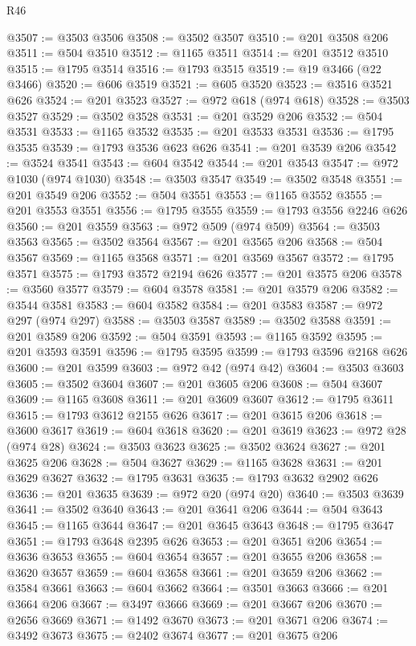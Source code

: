 \begin{lexlean}{R46}
\begin{coremodule}
@3507 := @3503 @3506
@3508 := @3502 @3507
@3510 := @201 @3508 @206
@3511 := @504 @3510
@3512 := @1165 @3511
@3514 := @201 @3512 @3510
@3515 := @1795 @3514
@3516 := @1793 @3515
@3519 := @19 @3466 (@22 @3466)
@3520 := @606 @3519
@3521 := @605 @3520
@3523 := @3516 @3521 @626
@3524 := @201 @3523
@3527 := @972 @618 (@974 @618)
@3528 := @3503 @3527
@3529 := @3502 @3528
@3531 := @201 @3529 @206
@3532 := @504 @3531
@3533 := @1165 @3532
@3535 := @201 @3533 @3531
@3536 := @1795 @3535
@3539 := @1793 @3536 @623 @626
@3541 := @201 @3539 @206
@3542 := @3524 @3541
@3543 := @604 @3542
@3544 := @201 @3543
@3547 := @972 @1030 (@974 @1030)
@3548 := @3503 @3547
@3549 := @3502 @3548
@3551 := @201 @3549 @206
@3552 := @504 @3551
@3553 := @1165 @3552
@3555 := @201 @3553 @3551
@3556 := @1795 @3555
@3559 := @1793 @3556 @2246 @626
@3560 := @201 @3559
@3563 := @972 @509 (@974 @509)
@3564 := @3503 @3563
@3565 := @3502 @3564
@3567 := @201 @3565 @206
@3568 := @504 @3567
@3569 := @1165 @3568
@3571 := @201 @3569 @3567
@3572 := @1795 @3571
@3575 := @1793 @3572 @2194 @626
@3577 := @201 @3575 @206
@3578 := @3560 @3577
@3579 := @604 @3578
@3581 := @201 @3579 @206
@3582 := @3544 @3581
@3583 := @604 @3582
@3584 := @201 @3583
@3587 := @972 @297 (@974 @297)
@3588 := @3503 @3587
@3589 := @3502 @3588
@3591 := @201 @3589 @206
@3592 := @504 @3591
@3593 := @1165 @3592
@3595 := @201 @3593 @3591
@3596 := @1795 @3595
@3599 := @1793 @3596 @2168 @626
@3600 := @201 @3599
@3603 := @972 @42 (@974 @42)
@3604 := @3503 @3603
@3605 := @3502 @3604
@3607 := @201 @3605 @206
@3608 := @504 @3607
@3609 := @1165 @3608
@3611 := @201 @3609 @3607
@3612 := @1795 @3611
@3615 := @1793 @3612 @2155 @626
@3617 := @201 @3615 @206
@3618 := @3600 @3617
@3619 := @604 @3618
@3620 := @201 @3619
@3623 := @972 @28 (@974 @28)
@3624 := @3503 @3623
@3625 := @3502 @3624
@3627 := @201 @3625 @206
@3628 := @504 @3627
@3629 := @1165 @3628
@3631 := @201 @3629 @3627
@3632 := @1795 @3631
@3635 := @1793 @3632 @2902 @626
@3636 := @201 @3635
@3639 := @972 @20 (@974 @20)
@3640 := @3503 @3639
@3641 := @3502 @3640
@3643 := @201 @3641 @206
@3644 := @504 @3643
@3645 := @1165 @3644
@3647 := @201 @3645 @3643
@3648 := @1795 @3647
@3651 := @1793 @3648 @2395 @626
@3653 := @201 @3651 @206
@3654 := @3636 @3653
@3655 := @604 @3654
@3657 := @201 @3655 @206
@3658 := @3620 @3657
@3659 := @604 @3658
@3661 := @201 @3659 @206
@3662 := @3584 @3661
@3663 := @604 @3662
@3664 := @3501 @3663
@3666 := @201 @3664 @206
@3667 := @3497 @3666
@3669 := @201 @3667 @206
@3670 := @2656 @3669
@3671 := @1492 @3670
@3673 := @201 @3671 @206
@3674 := @3492 @3673
@3675 := @2402 @3674
@3677 := @201 @3675 @206

\end{coremodule}
\end{lexlean}
